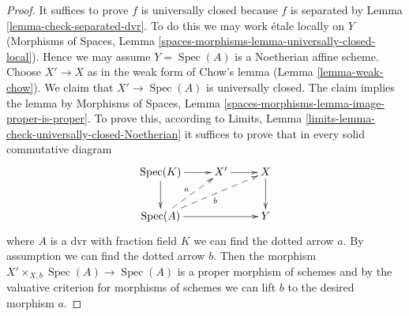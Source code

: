 \documentclass{stacks-project}
\theoremstyle{plain}
\theoremstyle{definition}
\theoremstyle{remark}
\numberwithin{equation}{subsection}
\def\Spec{\mathop{\mathrm{Spec}}}
\begin{document}
\begin{proof}
It suffices to prove $f$ is universally closed because $f$ is separated by
Lemma \ref{lemma-check-separated-dvr}.
To do this we may work \'etale locally on $Y$
(Morphisms of Spaces, Lemma
\ref{spaces-morphisms-lemma-universally-closed-local}).
Hence we may assume $Y = \Spec(A)$ is a Noetherian affine scheme.
Choose $X' \to X$ as in the weak form of Chow's lemma
(Lemma \ref{lemma-weak-chow}). We claim that $X' \to \Spec(A)$
is universally closed. The claim implies the lemma by
Morphisms of Spaces, Lemma \ref{spaces-morphisms-lemma-image-proper-is-proper}.
To prove this, according to
Limits, Lemma \ref{limits-lemma-check-universally-closed-Noetherian}
it suffices to prove that in every solid commutative diagram
$$
\xymatrix{
\Spec(K) \ar[r] \ar[d] & X' \ar[r] & X \ar[d] \\
\Spec(A) \ar[rr] \ar@{-->}[ru]^a \ar@{-->}[rru]_b & & Y
}
$$
where $A$ is a dvr with fraction field $K$ we can find the
dotted arrow $a$. By assumption we can find the dotted arrow $b$.
Then the morphism $X' \times_{X, b} \Spec(A) \to \Spec(A)$
is a proper morphism of schemes and by the valuative criterion
for morphisms of schemes we can lift $b$ to the desired morphism $a$.
\end{proof}
\end{document}

